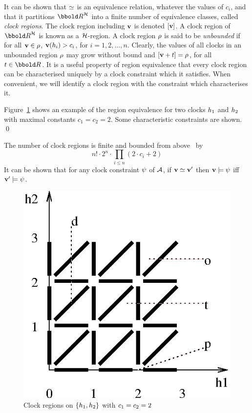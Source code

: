 {It can be shown that $\simeq$ is an equivalence relation, whatever the
values of $c_i$, and that it partitions $\clkvls$ into a finite number
of equivalence classes, called \emph{clock regions}. The clock region
including $\mathbf{v}$ is denoted $[\mathbf{v}]$. A clock region
of $\clkvls$ is known as a $\clocks$-region. A clock region $\rho$ is
said to be \emph{unbounded} if for all $\mathbf{v} \in \rho$,
$\mathbf{v}(h_i) > c_i$, for $i = 1,2,\ldots,n$. Clearly, the values
of all clocks in an unbounded region $\rho$ may grow without bound and
$[\mathbf{v} + t] = \rho$, for all $t \in \Time$.  It is a useful
property of region equivalence that every clock region can be
characterised uniquely by a clock constraint which it satisfies. When
convenient, we will identify a clock region with the constraint which
characterises it.

\begin{exampleb}
Figure~\ref{fig:regions} shows an example of the region equivalence for
two clocks $h_1$ and $h_2$ with maximal constants $c_1 = c_2 = 2$.
Some characteristic constraints are shown.
\qed
\end{exampleb}
The number of clock regions is finite and bounded from above~\cite{acd:93} by 
\[ n! \cdot 2^n \cdot \prod_{i \leq n} (2 \cdot c_i + 2) \] 
It can be shown that for any clock constraint ${\psi}$ of $\AA$,
if $\mathbf{v} \simeq \mathbf{v}'$ then $\mathbf{v} \models {\psi}$ iff 
$\mathbf{v}' \models {\psi}$.

\begin{figure}
\begin{center}
\includegraphics[width=.4\linewidth]{METHODS/regions.eps}
\end{center}
\caption{Clock regions on $\{h\protect_1, h\protect_2\}$ with $c\protect_1 = c\protect_2 = 2$\label{fig:regions}}
\end{figure}

}
